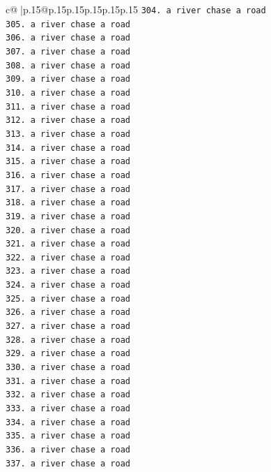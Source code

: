 \documentclass{article}
\begin{document}
{\begin{supertabular}{c@{$\;$}|p{.15\linewidth}@{}p{.15\linewidth}p{.15\linewidth}p{.15\linewidth}p{.15\linewidth}p{.15\linewidth}}
{{{\texttt{304. a river chase a road} \\
\texttt{305. a river chase a road} \\
\texttt{306. a river chase a road} \\
\texttt{307. a river chase a road} \\
\texttt{308. a river chase a road} \\
\texttt{309. a river chase a road} \\
\texttt{310. a river chase a road} \\
\texttt{311. a river chase a road} \\
\texttt{312. a river chase a road} \\
\texttt{313. a river chase a road} \\
\texttt{314. a river chase a road} \\
\texttt{315. a river chase a road} \\
\texttt{316. a river chase a road} \\
\texttt{317. a river chase a road} \\
\texttt{318. a river chase a road} \\
\texttt{319. a river chase a road} \\
\texttt{320. a river chase a road} \\
\texttt{321. a river chase a road} \\
\texttt{322. a river chase a road} \\
\texttt{323. a river chase a road} \\
\texttt{324. a river chase a road} \\
\texttt{325. a river chase a road} \\
\texttt{326. a river chase a road} \\
\texttt{327. a river chase a road} \\
\texttt{328. a river chase a road} \\
\texttt{329. a river chase a road} \\
\texttt{330. a river chase a road} \\
\texttt{331. a river chase a road} \\
\texttt{332. a river chase a road} \\
\texttt{333. a river chase a road} \\
\texttt{334. a river chase a road} \\
\texttt{335. a river chase a road} \\
\texttt{336. a river chase a road} \\
\texttt{337. a river chase a road} \\
}}}
\end{supertabular}}
\end{document}
